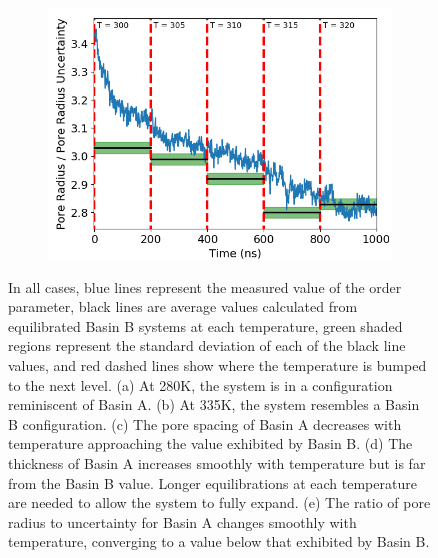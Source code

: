 \documentclass{article}
\begin{document}
\begin{figure}[!ht]
\begin{subfigure}[b]{0.325\textwidth}
                \caption{}\label{fig:thickness_step}
        \end{subfigure}
        \begin{subfigure}[b]{0.325\textwidth}
                \centering
                \includegraphics[width=\textwidth]{order_layered.png}
                \caption{}\label{fig:order_step}
        \end{subfigure}

	\caption{In all cases, blue lines represent the measured value of
	the order parameter, black lines are average values calculated from
	equilibrated Basin B systems at each temperature, green shaded regions
	represent the standard deviation of each of the black line values, and 
	red dashed lines show where the temperature is bumped to the next level.
	(a) At 280K, the system is in a configuration reminiscent of
	Basin A. (b) At 335K, the system resembles a Basin B configuration. (c) The pore
	spacing of Basin A decreases with temperature approaching the value 
	exhibited by Basin B. (d) The thickness of Basin A increases smoothly with 
	temperature but is far from the Basin B value. Longer equilibrations at 
	each temperature are needed to allow the system to fully expand. 
        (e) The ratio 
	of pore radius to uncertainty for Basin A changes smoothly with temperature,
	converging to a value below that exhibited by Basin B.}\label{fig:phase_transition}
  \end{figure}
\end{document}
